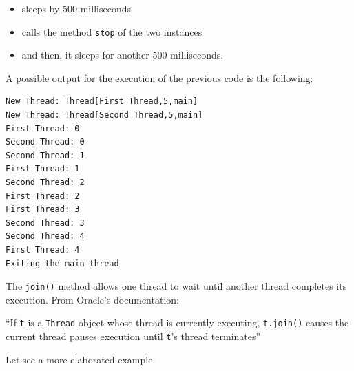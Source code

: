 \documentclass[openany, a4paper]{book}
\theoremstyle{break}
\theoremstyle{example}
\theoremstyle{note}
\theoremstyle{break}
\theoremstyle{exercise}
\begin{document}
\begin{itemize}
\item sleeps by 500 milliseconds
\item calls the method \texttt{stop} of the two instances
\item and then, it sleeps for another 500 milliseconds.
\end{itemize}

A possible output for the execution of the previous code is the following:

\begin{verbatim}
New Thread: Thread[First Thread,5,main]
New Thread: Thread[Second Thread,5,main]
First Thread: 0
Second Thread: 0
Second Thread: 1
First Thread: 1
Second Thread: 2
First Thread: 2
First Thread: 3
Second Thread: 3
Second Thread: 4
First Thread: 4
Exiting the main thread
\end{verbatim}


The \texttt{join()} method allows one thread to wait until another thread completes
its execution. From Oracle's documentation:

``If \texttt{t} is a \texttt{Thread} object whose thread is currently executing, \texttt{t.join()}
causes the current thread pauses execution until \texttt{t}'s thread terminates''

Let see a more elaborated example:
\end{document}
